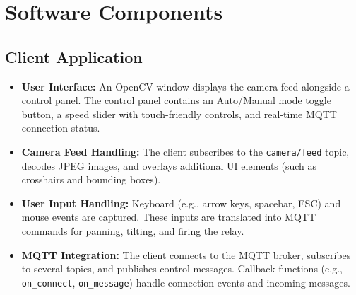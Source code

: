 \documentclass[12pt]{article}
\begin{document}
\section{Software Components}

\subsection{Client Application}
\begin{itemize}[leftmargin=*, label={--}]
    \item \textbf{User Interface:} An OpenCV window displays the camera feed alongside a control panel. The control panel contains an Auto/Manual mode toggle button, a speed slider with touch-friendly controls, and real-time MQTT connection status.
    \item \textbf{Camera Feed Handling:} The client subscribes to the \texttt{camera/feed} topic, decodes JPEG images, and overlays additional UI elements (such as crosshairs and bounding boxes).
    \item \textbf{User Input Handling:} Keyboard (e.g., arrow keys, spacebar, ESC) and mouse events are captured. These inputs are translated into MQTT commands for panning, tilting, and firing the relay.
    \item \textbf{MQTT Integration:} The client connects to the MQTT broker, subscribes to several topics, and publishes control messages. Callback functions (e.g., \texttt{on\_connect}, \texttt{on\_message}) handle connection events and incoming messages.
\end{itemize}
\end{document}
